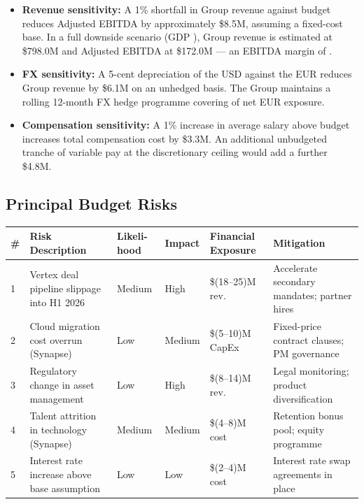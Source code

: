 \begin{itemize}
  \item \textbf{Revenue sensitivity:} A 1\% shortfall in Group revenue against budget
        reduces Adjusted EBITDA by approximately \$8.5M, assuming a fixed-cost base.
        In a full downside scenario (GDP ), Group revenue is estimated at
        \$798.0M and Adjusted EBITDA at \$172.0M — an EBITDA margin of .
  \item \textbf{FX sensitivity:} A 5-cent depreciation of the USD against the EUR
        reduces Group revenue by \$6.1M on an unhedged basis. The Group maintains a
        rolling 12-month FX hedge programme covering  of net EUR exposure.
  \item \textbf{Compensation sensitivity:} A 1\% increase in average salary above
        budget increases total compensation cost by \$3.3M. An additional
        unbudgeted tranche of variable pay at the discretionary ceiling would add
        a further \$4.8M.
\end{itemize}

\subsection{Principal Budget Risks}

\vspace{4pt}
\begin{center}
\renewcommand{\arraystretch}{1.35}
\begin{tabular}{C{0.5cm} L{3.8cm} C{1.5cm} C{1.5cm} C{2.4cm} L{3.0cm}}
  \toprule
  \color{white}\textbf{\#} &
  \color{white}\textbf{Risk Description} &
  \color{white}\textbf{Likeli-hood} &
  \color{white}\textbf{Impact} &
  \color{white}\textbf{Financial Exposure} &
  \color{white}\textbf{Mitigation} \\
   & Vertex deal pipeline slippage into H1 2026    & Medium & High   & \$(18–25)M rev. & Accelerate secondary mandates; partner hires \\[2pt]
  2 & Cloud migration cost overrun (Synapse)        & Low    & Medium & \$(5–10)M CapEx & Fixed-price contract clauses; PM governance \\[2pt]
  3 & Regulatory change in asset management        & Low    & High   & \$(8–14)M rev.  & Legal monitoring; product diversification \\[2pt]
  4 & Talent attrition in technology (Synapse)     & Medium & Medium & \$(4–8)M cost   & Retention bonus pool; equity programme \\[2pt]
  5 & Interest rate increase above base assumption & Low    & Low    & \$(2–4)M cost   & Interest rate swap agreements in place \\
  \bottomrule
\end{tabular}
\end{center}

